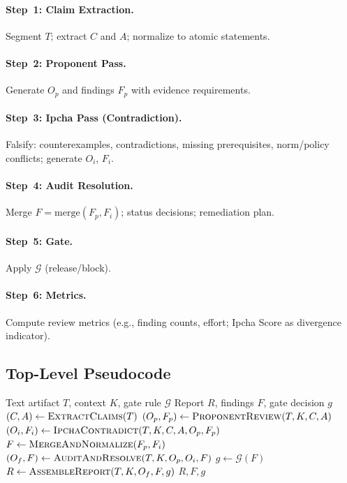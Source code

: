 \documentclass[11pt,a4paper]{article}
\newcommand{\methodname}{\textsc{Ipcha Mistabra}}
\begin{document}
\paragraph{Step~1: Claim Extraction.}
Segment $T$; extract $C$ and $A$; normalize to atomic statements.

\paragraph{Step~2: Proponent Pass.}
Generate $O_p$ and findings $F_p$ with evidence requirements.

\paragraph{Step~3: Ipcha Pass (Contradiction).}
Falsify: counterexamples, contradictions, missing prerequisites, norm/policy conflicts; generate $O_i$, $F_i$.

\paragraph{Step~4: Audit Resolution.}
Merge $F=\mathrm{merge}(F_p, F_i)$; status decisions; remediation plan.

\paragraph{Step~5: Gate.}
Apply $\mathcal{G}$ (release/block).

\paragraph{Step~6: Metrics.}
Compute review metrics (e.g., finding counts, effort; Ipcha Score as divergence indicator).

\subsection{Top-Level Pseudocode}
\begin{algorithm}[h]
\caption{\methodname{}: Institutionalized Contradiction for Text Artifact Review}
\begin{algorithmic}[1]
\Require Text artifact $T$, context $K$, gate rule $\mathcal{G}$
\Ensure Report $R$, findings $F$, gate decision $g$
\State $(C,A) \gets \textsc{ExtractClaims}(T)$  
\State $(O_p, F_p) \gets \textsc{ProponentReview}(T,K,C,A)$
\State $(O_i, F_i) \gets \textsc{IpchaContradict}(T,K,C,A,O_p,F_p)$ 
\State $F \gets \textsc{MergeAndNormalize}(F_p,F_i)$
\State $(O_f, F) \gets \textsc{AuditAndResolve}(T,K,O_p,O_i,F)$
\State $g \gets \mathcal{G}(F)$
\State $R \gets \textsc{AssembleReport}(T,K,O_f,F,g)$
\State \Return $R, F, g$
\end{algorithmic}
\end{algorithm}
\end{document}
